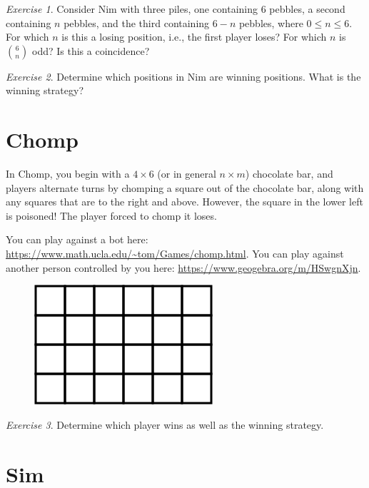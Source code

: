 \documentclass{article}
\theoremstyle{definition}
\theoremstyle{remark}
\newtheorem{exercise}{Exercise}
\begin{document}
    \begin{exercise}
        Consider Nim with three piles, one containing 6 pebbles, a second containing \(n\) pebbles, and the third containing \(6-n\) pebbles, where \(0\leq n\leq 6\).
        For which \(n\) is this a losing position, i.e., the first player loses?
        For which \(n\) is \(\binom{6}{n}\) odd?
        Is this a coincidence?
    \end{exercise}

    \begin{exercise}
        Determine which positions in Nim are winning positions.
        What is the winning strategy?
    \end{exercise}

\section{Chomp}

    In Chomp, you begin with a \(4\times 6\) (or in general \(n\times m\)) chocolate bar, and players alternate turns by chomping a square out of the chocolate bar, along with any squares that are to the right and above.
    However, the square in the lower left is poisoned!
    The player forced to chomp it loses.

    You can play against a bot here: \url{https://www.math.ucla.edu/~tom/Games/chomp.html}.
    You can play against another person controlled by you here: \url{https://www.geogebra.org/m/HSwgnXjn}.

    \begin{figure}[hbt!]
        \small
        \centering
        \includegraphics[scale = 0.4]{Pics/chomp.png}
    \end{figure}

    \begin{exercise}
        Determine which player wins as well as the winning strategy.
    \end{exercise}

\section{Sim}
\end{document}
